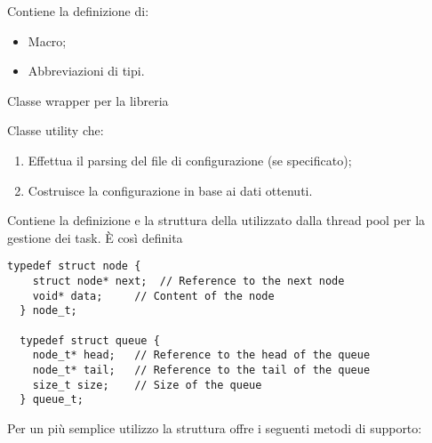   \begin{center}  \end{center}
  Contiene la definizione di:
  \begin{itemize}
    \item Macro;
    \item Abbreviazioni di tipi.
  \end{itemize}

  \begin{center}  \end{center}
  Classe wrapper per la libreria 

  \begin{center}  \end{center}
  Classe utility che:

  \begin{enumerate}
    \item Effettua il parsing del file di configurazione (se specificato);
    \item Costruisce la configurazione in base ai dati ottenuti.
  \end{enumerate}

  \begin{center}  \end{center}

  Contiene la definizione e la struttura della  \footnotemark {} utilizzato dalla thread pool per la gestione dei task. È così definita

  \begin{lstlisting}[language={[POSIX]C}, style=wnumbers]
  typedef struct node {
    struct node* next;	// Reference to the next node
    void* data;		// Content of the node
  } node_t;

  typedef struct queue {
    node_t* head;	// Reference to the head of the queue
    node_t* tail;	// Reference to the tail of the queue
    size_t size;	// Size of the queue
  } queue_t;
  \end{lstlisting}

  Per un più semplice utilizzo la struttura offre i seguenti metodi di supporto:

